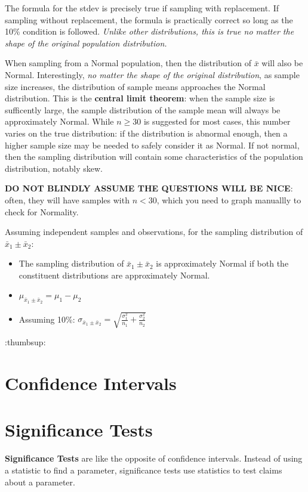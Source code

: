 \documentclass[12pt, a4paper]{article}
\theoremstyle{definition}
\begin{document}
The formula for the stdev is precisely true if sampling with replacement.
If sampling without replacement, the formula is practically correct so long as the 10\% condition is followed.
\textit{Unlike other distributions, this is true no matter the shape of the original population distribution.}

When sampling from a Normal population, then the distribution of $\bar{x}$ will also be Normal.
Interestingly, \textit{no matter the shape of the original distribution}, as sample size increases, the distribution of sample means approaches the Normal distribution.
This is the \textbf{central limit theorem}: when the sample size is sufficently large, the sample distribution of the sample mean will always be approximately Normal.
While $n \geq 30$ is suggested for most cases, this number varies on the true distribution: if the distribution is abnormal enough, then a higher sample size may be needed to safely consider it as Normal.
If not normal, then the sampling distribution will contain some characteristics of the population distribution, notably skew.

\textbf{DO NOT BLINDLY ASSUME THE QUESTIONS WILL BE NICE}: often, they will have samples with $n < 30$, which you need to graph manuallly to check for Normality.

Assuming independent samples and observations, for the sampling distribution of $\bar{x}_1 \pm \bar{x}_2$:
\begin{itemize}
    \item The sampling distribution of $\bar{x}_1 \pm \bar{x}_2$ is approximately Normal if both the constituent distributions are approximately Normal.
    \item $\mu_{\bar{x}_1 \pm \bar{x}_2} = \mu_1 - \mu_2$
    \item Assuming 10\%: $\sigma_{\bar{x}_1 \pm \bar{x}_2} = \sqrt{\frac{\sigma_1^2}{n_1} + \frac{\sigma_2^2}{n_2}}$
\end{itemize}

:thumbsup:

\newpage

\section{Confidence Intervals}

\newpage

\section{Significance Tests}
\textbf{Significance Tests} are like the opposite of confidence intervals. Instead of using a statistic to find a parameter, significance tests use statistics to test claims about a parameter.
\end{document}
